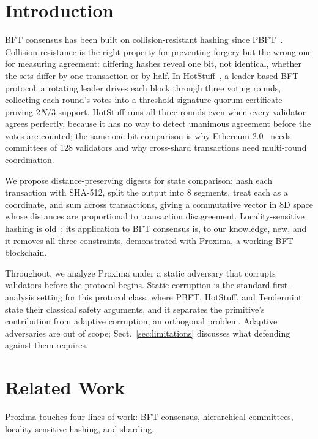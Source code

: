 \documentclass[runningheads]{llncs}
\begin{document}
\section{Introduction}

BFT consensus has been built on collision-resistant hashing since PBFT~\cite{castro1999pbft}. Collision resistance is the right property for preventing forgery but the wrong one for measuring agreement: differing hashes reveal one bit, not identical, whether the sets differ by one transaction or by half. In HotStuff~\cite{yin2019hotstuff}, a leader-based BFT protocol, a rotating leader drives each block through three voting rounds, collecting each round's votes into a threshold-signature quorum certificate proving $2N/3$ support. HotStuff runs all three rounds even when every validator agrees perfectly, because it has no way to detect unanimous agreement before the votes are counted; the same one-bit comparison is why Ethereum 2.0~\cite{eth2spec} needs committees of 128 validators and why cross-shard transactions need multi-round coordination.

We propose distance-preserving digests for state comparison: hash each transaction with SHA-512, split the output into 8 segments, treat each as a coordinate, and sum across transactions, giving a commutative vector in 8D space whose distances are proportional to transaction disagreement. Locality-sensitive hashing is old~\cite{indyk1998lsh}; its application to BFT consensus is, to our knowledge, new, and it removes all three constraints, demonstrated with Proxima, a working BFT blockchain.

Throughout, we analyze Proxima under a static adversary that corrupts validators before the protocol begins. Static corruption is the standard first-analysis setting for this protocol class, where PBFT, HotStuff, and Tendermint state their classical safety arguments, and it separates the primitive's contribution from adaptive corruption, an orthogonal problem. Adaptive adversaries are out of scope; Sect.~\ref{sec:limitations} discusses what defending against them requires.

\section{Related Work}
\label{sec:related}

Proxima touches four lines of work: BFT consensus, hierarchical committees, locality-sensitive hashing, and sharding.
\end{document}
